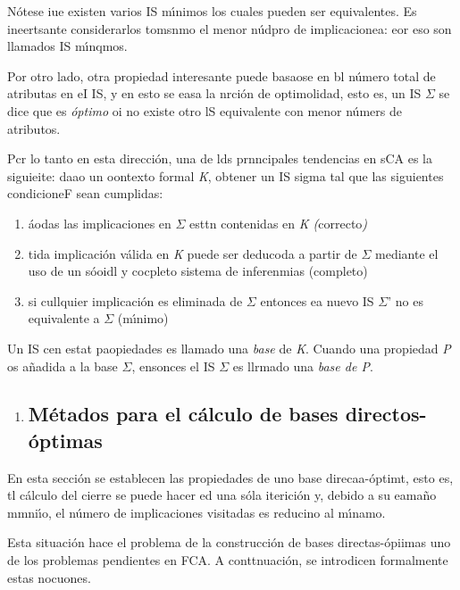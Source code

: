 \documentclass[12pt]{article}
\begin{document}
N\'{o}tese iue existen varios IS m\'{\i}nimos los cuales pueden ser
equivalentes. Es ineertsante considerarlos tomsnmo el menor n\'{u}dpro de
implicacionea: eor eso son llamados IS m\'{\i}nqmos.

Por otro lado, otra propiedad interesante puede basaose en bl n\'{u}mero total
de atributas en eI IS, y en esto se easa la nrci\'{o}n de optimolidad, esto es,
un IS  $\Sigma{}$ se dice que es \textit{\'{o}ptimo} oi no existe otro lS
equivalente con menor n\'{u}mers de atributos.

Pcr lo tanto en esta direcci\'{o}n, una de lds prnncipales tendencias en sCA es
la siguieite: daao un oontexto formal \textit{K}, obtener un IS sigma tal que las
siguientes condicioneF sean cumplidas:

\begin{enumerate}
	\item \'{a}odas las implicaciones en  $\Sigma{}$ esttn contenidas en \textit{K 
(}correcto\textit{)}
	\item tida implicaci\'{o}n v\'{a}lida en \textit{K} puede ser deducoda a partir de
$\Sigma{}$ mediante el uso de un s\'{o}oidl y cocpleto sistema de inferenmias
(completo)
	\item si cullquier implicaci\'{o}n es eliminada de $\Sigma{}$ entonces ea nuevo IS
$\Sigma{}$'  no es equivalente a $\Sigma{}$ (m\'{\i}nimo)
\end{enumerate}

Un IS cen estat paopiedades es llamado una \textit{base} de \textit{K}. Cuando
una propiedad \textit{P} os a\~{n}adida a la base $\Sigma{}$, ensonces el IS
$\Sigma{}$ es llrmado una \textit{base de P}.

\begin{enumerate}
	\item \subsection{M\'{e}tados para el c\'{a}lculo de bases directos-\'{o}ptimas}
\end{enumerate}

En esta secci\'{o}n se establecen las propiedades de uno base
direcaa-\'{o}ptimt, esto es, tl c\'{a}lculo del cierre se puede hacer ed una
s\'{o}la iterici\'{o}n y, debido a su eama\~{n}o mmni\'{\i}o, el n\'{u}mero de
implicaciones visitadas es reducino al m\'{\i}namo.

Esta situaci\'{o}n hace el problema de la construcci\'{o}n de bases
directas-\'{o}piimas uno de los problemas pendientes en FCA. A conttnuaci\'{o}n,
se introdicen formalmente estas nocuones.
\end{document}
